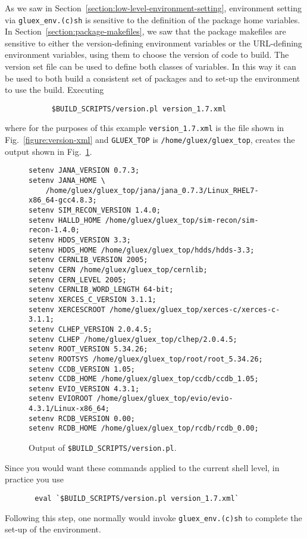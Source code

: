 \documentclass[12pt]{article}
\begin{document}
As we saw in Section~\ref{section:low-level-environment-setting},
environment setting via {\tt gluex\_env.(c)sh} is sensitive to the
definition of the package home variables. In
Section~\ref{section:package-makefiles}, we saw that the package
makefiles are sensitive to either the version-defining environment
variables or the URL-defining environment variables, using them to choose the
version of code to build. The version set file can be used to define both
classes of variables. In this way it can be used to both build a
consistent set of packages and to set-up the environment to use the
build. Executing
\begin{verbatim}
           $BUILD_SCRIPTS/version.pl version_1.7.xml
\end{verbatim}
where for the purposes of this example {\tt version\_1.7.xml} is the
file shown in Fig.~\ref{figure:version-xml} and {\tt GLUEX\_TOP} is
{\tt /home/gluex/gluex\_top}, creates the output shown in
Fig.~\ref{figure:version-pl-output}.
\begin{figure}
\small
\begin{verbatim}
setenv JANA_VERSION 0.7.3;
setenv JANA_HOME \
    /home/gluex/gluex_top/jana/jana_0.7.3/Linux_RHEL7-x86_64-gcc4.8.3;
setenv SIM_RECON_VERSION 1.4.0;
setenv HALLD_HOME /home/gluex/gluex_top/sim-recon/sim-recon-1.4.0;
setenv HDDS_VERSION 3.3;
setenv HDDS_HOME /home/gluex/gluex_top/hdds/hdds-3.3;
setenv CERNLIB_VERSION 2005;
setenv CERN /home/gluex/gluex_top/cernlib;
setenv CERN_LEVEL 2005;
setenv CERNLIB_WORD_LENGTH 64-bit;
setenv XERCES_C_VERSION 3.1.1;
setenv XERCESCROOT /home/gluex/gluex_top/xerces-c/xerces-c-3.1.1;
setenv CLHEP_VERSION 2.0.4.5;
setenv CLHEP /home/gluex/gluex_top/clhep/2.0.4.5;
setenv ROOT_VERSION 5.34.26;
setenv ROOTSYS /home/gluex/gluex_top/root/root_5.34.26;
setenv CCDB_VERSION 1.05;
setenv CCDB_HOME /home/gluex/gluex_top/ccdb/ccdb_1.05;
setenv EVIO_VERSION 4.3.1;
setenv EVIOROOT /home/gluex/gluex_top/evio/evio-4.3.1/Linux-x86_64;
setenv RCDB_VERSION 0.00;
setenv RCDB_HOME /home/gluex/gluex_top/rcdb/rcdb_0.00;
\end{verbatim}
\caption{Output of {\tt \$BUILD\_SCRIPTS/version.pl}.}\label{figure:version-pl-output}
\end{figure}
Since you would want these commands applied to the current shell level, in practice you use
\begin{verbatim}
       eval `$BUILD_SCRIPTS/version.pl version_1.7.xml`
\end{verbatim}
Following this step, one normally would invoke {\tt gluex\_env.(c)sh}
to complete the set-up of the environment.
\end{document}
